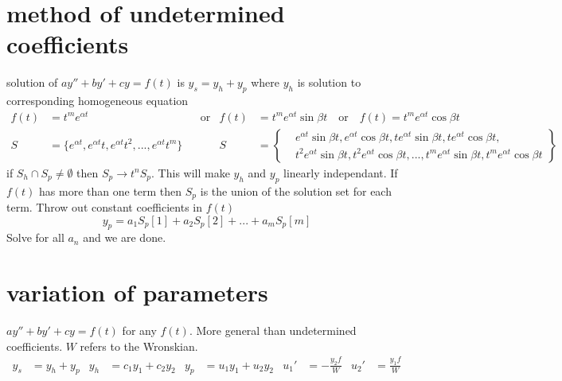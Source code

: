 \documentclass{article}
\begin{document}
\section*{method of undetermined coefficients}
solution of $ay''+by'+cy=f(t)$ is $y_s=y_h+y_p$ where $y_h$ is solution to corresponding homogeneous equation
\begin{align*}
	f(t)&=t^me^{\alpha t} &&\text{or}& f(t)&=t^me^{\alpha t}\sin \beta t  \quad\text{or}\quad f(t)=t^me^{\alpha t}\cos \beta t\\
	S&=\{e^{\alpha t},e^{\alpha t}t,e^{\alpha t}t^2,...,e^{\alpha t}t^m\} &&&
	S&=\left\{
	\begin{aligned}
		&e^{\alpha t}\sin\beta t,e^{\alpha t}\cos\beta t,
		te^{\alpha t}\sin\beta t,te^{\alpha t}\cos\beta t,\\
		&t^2e^{\alpha t}\sin\beta t, t^2e^{\alpha t}\cos\beta t,...,
		t^me^{\alpha t}\sin\beta t,t^me^{\alpha t}\cos\beta t
	\end{aligned}
	\right\}
\end{align*}
if $S_h\cap S_p\neq\emptyset$ then $S_p\rightarrow t^nS_p$. This will make $y_h$ and $y_p$ linearly independant. If $f(t)$ has more than one term then $S_p$ is the union of the solution set for each term. Throw out constant coefficients in $f(t)$
\[y_p=a_1S_p[1]+a_2S_p[2]+...+a_mS_p[m]\]
Solve for all $a_n$ and we are done.

\section*{variation of parameters}
$ay''+by'+cy=f(t)$ for any $f(t)$. More general than undetermined coefficients. $W$ refers to the Wronskian.
\begin{align*}
	y_s&=y_h+y_p & y_h&=c_1y_1+c_2y_2 & y_p&=u_1y_1+u_2y_2 & {u_1}'&=-\frac{y_2f}{W} & {u_2}'&=\frac{y_1f}{W}
\end{align*}
\end{document}
